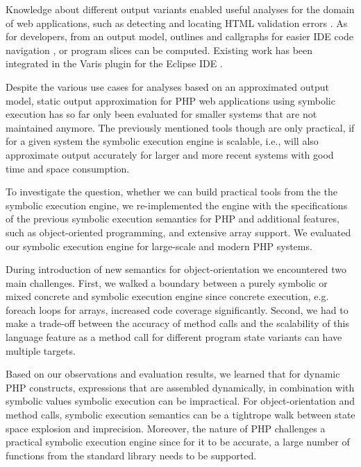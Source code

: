 \documentclass[preprint]{sig-alternate-05-2015}
\begin{document}

Knowledge about different output variants enabled useful analyses
for the domain of web applications, such as detecting and locating HTML
validation errors \cite{Nguyen:2011:AFH:2190078.2190142}. As for developers,
from an output model, outlines and callgraphs for easier IDE code navigation
\cite{Nguyen:2014:BCG:2635868.2635928}, or program slices
\cite{Nguyen:2015:CPS:2786805.2786872} can be computed. Existing work has been
integrated in the Varis plugin for the Eclipse IDE \cite{Nguyen:2015:VIS:2819009.2819140}.

Despite the various use cases for analyses based on an approximated output
model, static output approximation for PHP web applications using symbolic
execution has so far only been evaluated for smaller systems that are not
maintained anymore. The previously mentioned tools though are only practical, if
for a given system the symbolic execution engine is scalable, i.e., will also
approximate output accurately for larger and more recent systems with good time
and space consumption.

To investigate the question, whether we can build practical tools from the
the symbolic execution engine, we re-implemented the engine with the specifications
of the previous symbolic execution semantics
\cite{Nguyen:2014:BCG:2635868.2635928} for PHP and additional features, such as
object-oriented programming, and extensive array support. We evaluated our
symbolic execution engine for large-scale and modern PHP systems.

During introduction of new semantics for object-orientation we encountered two main challenges. 
First, we walked a boundary between a purely symbolic or mixed concrete and symbolic execution engine
since concrete execution, e.g. foreach loops for arrays, increased code
coverage significantly. Second, we had to make a trade-off between the accuracy
of method calls and the scalability of this language feature as a method call
for different program state variants can have multiple targets.

Based on our observations and evaluation results, we learned that for dynamic
PHP constructs, expressions that are assembled dynamically, in combination with
symbolic values symbolic execution can be impractical. For object-orientation
and method calls, symbolic execution semantics can be a tightrope walk between
state space explosion and imprecision. Moreover, the nature of PHP challenges a
practical symbolic execution engine since for it to be accurate, a large number
of functions from the standard library needs to be supported.
\end{document}
